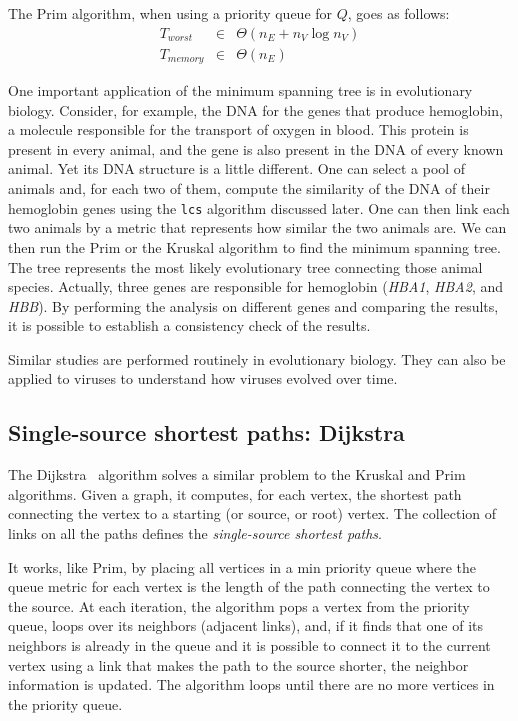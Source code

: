 \documentclass[justified, sixbynine]{tufte-book}
\def\ft{\small\tt}
\theoremstyle{plain}%
\newtheorem * {corollary}{Corollary}
\theoremstyle{definition}
\theoremstyle{remark}
\newtheorem * {remark}{Remark}
\newtheorem * {note}{Note}
\begin{document}
\begin{fullwidth}
The Prim algorithm, when using a priority queue for $Q$, goes as follows:
\begin{eqnarray}
T_{worst} &\in &\Theta (n_E+n_V\log n_V) \\
T_{memory} &\in &\Theta (n_E)
\end{eqnarray}

One important application of the minimum spanning tree is in evolutionary biology. Consider, for example, the DNA for the genes that produce hemoglobin, a molecule responsible for the transport of oxygen in blood. This protein is present in every animal, and the gene is also present in the DNA of every known animal. Yet its DNA structure is a little different. One can select a pool of animals and, for each two of them, compute the similarity of the DNA of their hemoglobin genes using the {\ft lcs} algorithm discussed later. One can then link each two animals by a metric that represents how similar the two animals are. We can then run the Prim or the Kruskal algorithm to find the minimum spanning tree. The tree represents the most likely evolutionary tree connecting those animal species. Actually, three genes are responsible for hemoglobin ({\it HBA1}, {\it HBA2}, and {\it HBB}). By performing the analysis on different genes and comparing the results, it is possible to establish a consistency check of the results.~\cite{evolutionary}

Similar studies are performed routinely in evolutionary biology. They can also be applied to viruses to understand how viruses evolved over time.~\cite{korber}

\subsection{Single-source shortest paths: Dijkstra}


The Dijkstra~\cite{dijkstra} algorithm solves a similar problem to the Kruskal and Prim algorithms. Given a graph, it computes, for each vertex, the shortest path connecting the vertex to a starting (or source, or root) vertex. The collection of links on all the paths defines the {\it single-source shortest paths}.

It works, like Prim, by placing all vertices in a min priority queue where the queue metric for each vertex is the length of the path connecting the vertex to the source. At each iteration, the algorithm pops a vertex from the priority queue, loops over its neighbors (adjacent links), and, if it finds that one of its neighbors is already in the queue and it is possible to connect it to the current vertex using a link that makes the path to the source shorter, the neighbor information is updated. The algorithm loops until there are no more vertices in the priority queue.


\end{fullwidth}
\end{document}
